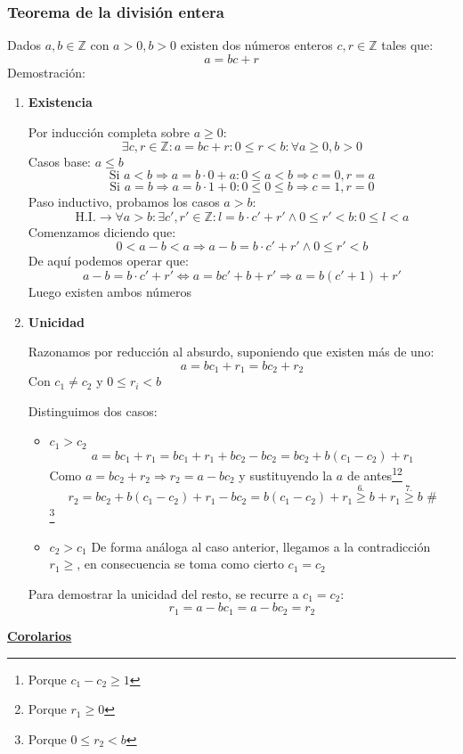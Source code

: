 \documentclass[10pt,a4paper,openright]{book}
\begin{document}
\subsubsection*{Teorema de la división entera}
Dados $a,b\in \mathbb Z$ con $a>0, b>0$ existen dos números enteros $c,r\in \mathbb Z$ tales que:
$$a=bc+r$$
Demostración:
\begin{enumerate}
\item \textbf{Existencia}\par
	Por inducción completa sobre $a\geq 0$:
	$$\exists c,r\in \mathbb Z : a=bc+r: 0\leq r <b : \forall a\geq 0,b>0$$
	Casos base: $a\leq b $
	$$\mbox{Si } a<b\Rightarrow a= b\cdot 0+a : 0\leq a<b \Rightarrow c=0, r=a$$
	$$\mbox{Si }a=b \Rightarrow a=b\cdot 1 + 0 : 0\leq 0\leq b\Rightarrow c=1,r=0$$
	Paso inductivo, probamos los casos $a>b$:
	$$\mbox{H.I.}\rightarrow \forall a>b: \exists c',r'\in\mathbb Z : l=b\cdot c'+r' \wedge 0\leq r'<b: 0\leq l<a$$
	Comenzamos diciendo que:
	$$0< a-b< a\Rightarrow a-b=b\cdot c'+r'\wedge 0\leq r'<b$$
	De aquí podemos operar que:
	$$a-b=b\cdot c'+r'\Leftrightarrow a=bc'+b+r'\Rightarrow a=b(c'+1)+r'$$
	Luego existen ambos números
	\vspace{0.5cm}
\item \textbf{Unicidad}\par
	Razonamos por reducción al absurdo, suponiendo que existen más de uno:
	$$a=bc_1+r_1=bc_2+r_2$$
	Con $c_1\neq c_2$ y $0\leq r_i<b$\par
	Distinguimos dos casos:
	\begin{itemize}
	\item $c_1>c_2$
	$$a=bc_1+r_1=bc_1+r_1+bc_2-bc_2=bc_2+b(c_1-c_2)+r_1$$
	Como $a=bc_2+r_2\Rightarrow r_2=a-bc_2$ y sustituyendo la $a$ de antes\footnote{Porque $c_1-c_2\geq 1$}\footnote{Porque $r_1\geq 0$}
	$$r_2=bc_2+b(c_1-c_2)+r_1-bc_2=b(c_1-c_2)+r_1\stackrel{6.}{\geq} b+r_1\stackrel{7.}{\geq} b \mbox{ \#}$$\footnote{Porque $0\leq r_2<b$}
	
	\item $c_2>c_1$
	De forma análoga al caso anterior, llegamos a la contradicción $r_1\geq $, en consecuencia se toma como cierto $c_1=c_2$
	\end{itemize}
	Para demostrar la unicidad del resto, se recurre a $c_1=c_2$:
	$$r_1=a-bc_1=a-bc_2=r_2$$	
\end{enumerate}
\underline{\textbf{Corolarios}}
\end{document}

